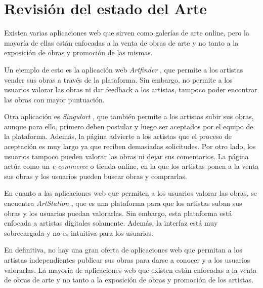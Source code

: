 \section{Revisión del estado del Arte}

{ \setlength{\parskip}{7mm} %
Existen varias aplicaciones web que sirven como galerías de arte online, pero la mayoría
de ellas están enfocadas a la venta de obras de arte y no tanto a la exposición de obras
y promoción de las mismas.

Un ejemplo de esto es la aplicación web \textit{Artfinder} \cite{artfinder}, que permite
a los artistas vender sus obras a través de la plataforma. Sin embargo, no permite a los
usuarios valorar las obras ni dar feedback a los artistas, tampoco poder encontrar las obras
con mayor puntuación.

Otra aplicación es \textit{Singulart} \cite{singulart}, que también permite a los artistas
subir sus obras, aunque para ello, primero deben postular y luego ser aceptados por el equipo
de la plataforma. Además, la página advierte a los artistas que el proceso de aceptación
es muy largo ya que reciben demasiadas solicitudes. Por otro lado, los usuarios tampoco
pueden valorar las obras ni dejar sus comentarios. La página actúa como un \textit{e-commerce}
o tienda online, en la que los artistas ponen a la venta sus obras y los usuarios pueden
buscar obras y comprarlas.

En cuanto a las aplicaciones web que permiten a los usuarios valorar las obras, se encuentra
\textit{ArtStation} \cite{artstation}, que es una plataforma para que los artistas suban
sus obras y los usuarios puedan valorarlas. Sin embargo, esta plataforma está enfocada
a artistas digitales solamente. Además, la interfaz está muy sobrecargada y no es intuitiva
para los usuarios.

En definitiva, no hay una gran oferta de aplicaciones web que permitan a los artistas
independientes publicar sus obras para darse a conocer y a los usuarios valorarlas. La
mayoría de aplicaciones web que existen están enfocadas a la venta de obras de arte y no
tanto a la exposición de obras y promoción de los artistas.
}